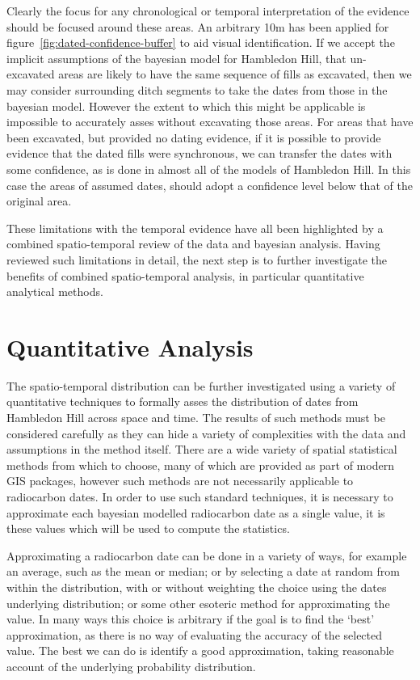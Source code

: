 Clearly the focus for any chronological or temporal interpretation of the evidence should be focused around these areas. An arbitrary 10m has been applied for figure~\ref{fig:dated-confidence-buffer} to aid visual identification. If we accept the implicit assumptions of the bayesian model for Hambledon Hill, that un-excavated areas are likely to have the same sequence of fills as excavated, then we may consider surrounding ditch segments to take the dates from those in the bayesian model. However the extent to which this might be applicable is impossible to accurately asses without excavating those areas. For areas that have been excavated, but provided no dating evidence, if it is possible to provide evidence that the dated fills were synchronous, we can transfer the dates with some confidence, as is done in almost all of the models of Hambledon Hill. In this case the areas of assumed dates, should adopt a confidence level below that of the original area.

These limitations with the temporal evidence have all been highlighted by a combined spatio-temporal review of the data and bayesian analysis. Having reviewed such limitations in detail, the next step is to further investigate the benefits of combined spatio-temporal analysis, in particular quantitative analytical methods.

\section{Quantitative Analysis}
The spatio-temporal distribution can be further investigated using a variety of quantitative techniques to formally asses the distribution of dates from Hambledon Hill across space and time. The results of such methods must be considered carefully as they can hide a variety of complexities with the data and assumptions in the method itself. There are a wide variety of spatial statistical methods from which to choose, many of which are provided as part of modern GIS packages, however such methods are not necessarily applicable to radiocarbon dates. In order to use such standard techniques, it is necessary to approximate each bayesian modelled radiocarbon date as a single value, it is these values which will be used to compute the statistics. 

Approximating a radiocarbon date can be done in a variety of ways, for example an average, such as the mean or median; or by selecting a date at random from within the distribution, with or without weighting the choice using the dates underlying distribution; or some other esoteric method for approximating the value. In many ways this choice is arbitrary if the goal is to find the `best' approximation, as there is no way of evaluating the accuracy of the selected value. The best we can do is identify a good approximation, taking reasonable account of the underlying probability distribution.  

